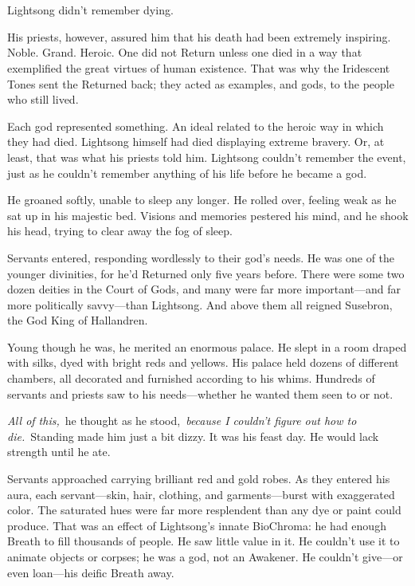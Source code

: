 \chapter{}

Lightsong didn’t remember dying.

His priests, however, assured him that his death had been extremely inspiring. Noble. Grand. Heroic. One did not Return unless one died in a way that exemplified the great virtues of human existence. That was why the Iridescent Tones sent the Returned back; they acted as examples, and gods, to the people who still lived.

Each god represented something. An ideal related to the heroic way in which they had died. Lightsong himself had died displaying extreme bravery. Or, at least, that was what his priests told him. Lightsong couldn’t remember the event, just as he couldn’t remember anything of his life before he became a god.

He groaned softly, unable to sleep any longer. He rolled over, feeling weak as he sat up in his majestic bed. Visions and memories pestered his mind, and he shook his head, trying to clear away the fog of sleep.

Servants entered, responding wordlessly to their god’s needs. He was one of the younger divinities, for he’d Returned only five years before. There were some two dozen deities in the Court of Gods, and many were far more important—and far more politically savvy—than Lightsong. And above them all reigned Susebron, the God King of Hallandren.

Young though he was, he merited an enormous palace. He slept in a room draped with silks, dyed with bright reds and yellows. His palace held dozens of different chambers, all decorated and furnished according to his whims. Hundreds of servants and priests saw to his needs—whether he wanted them seen to or not.

\textit{All of this,}~he thought as he stood,~\textit{because I couldn’t figure out how to die.}~Standing made him just a bit dizzy. It was his feast day. He would lack strength until he ate.

Servants approached carrying brilliant red and gold robes. As they entered his aura, each servant—skin, hair, clothing, and garments—burst with exaggerated color. The saturated hues were far more resplendent than any dye or paint could produce. That was an effect of Lightsong’s innate BioChroma: he had enough Breath to fill thousands of people. He saw little value in it. He couldn’t use it to animate objects or corpses; he was a god, not an Awakener. He couldn’t give—or even loan—his deific Breath away.

